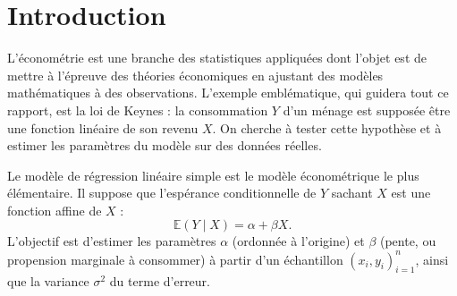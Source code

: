 \documentclass[12pt,a4paper]{article}
\theoremstyle{definition}
\theoremstyle{remark}
\newcommand{\Esp}{\mathbb{E}}
\begin{document}

\begin{abstract}
\noindent
Econometrics is the discipline that uses statistical methods to test and quantify
economic theories from empirical observations.
This report is dedicated to the study of simple linear regression, the most fundamental
econometric model, in which a response variable $Y$ is modelled as a linear function
of a single explanatory variable $X$ up to a random noise term~$\varepsilon$.
We first present the theoretical
regression model, distinguishing the probabilistic setting (regression between random
variables) from the fixed-design setting (linear model).
We then derive the Ordinary Least Squares (OLS) estimators $a$ and $b$ of the intercept
$\alpha$ and slope~$\beta$, show that the regression line passes through the empirical
centre of gravity, and establish, via three classical theorems, that these estimators
are unbiased (Theorem~1), of minimum variance among all linear unbiased estimators
(Gauss--Markov theorem, Theorem~2), and that the residual variance estimator $\hat{\sigma}^2$
is also unbiased (Theorem~3).
Statistical tests (analysis of variance, Student test) and a numerical illustration
on a real dataset are also presented.
\end{abstract}

\vspace{0.5cm}
\tableofcontents
\newpage





\section{Introduction}

L'économétrie est une branche des statistiques appliquées dont l'objet est de mettre
à l'épreuve des théories économiques en ajustant des modèles mathématiques à des
observations. L'exemple emblématique, qui guidera tout ce rapport, est la loi
de Keynes : la consommation $Y$ d'un ménage est supposée être une fonction linéaire
de son revenu $X$. On cherche à tester cette hypothèse et à estimer les paramètres
du modèle sur des données réelles.

Le modèle de régression linéaire simple est le modèle économétrique le plus
élémentaire. Il suppose que l'espérance conditionnelle de $Y$ sachant $X$ est
une fonction affine de $X$ :
\[
  \Esp(Y \mid X) = \alpha + \beta X.
\]
L'objectif est d'estimer les paramètres $\alpha$ (ordonnée à l'origine) et $\beta$
(pente, ou propension marginale à consommer) à partir d'un échantillon
$(x_i, y_i)_{i=1}^n$, ainsi que la variance $\sigma^2$ du terme d'erreur.
\end{document}
